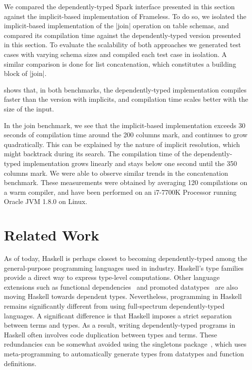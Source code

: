 We compared the dependently-typed Spark interface presented in this section against the implicit-based implementation of Frameless.
To do so, we isolated the implicit-based implementation of the |join| operation on table schemas, and compared its compilation time against the dependently-typed version presented in this section.
To evaluate the scalability of both approaches we generated test cases with varying schema sizes and compiled each test case in isolation.
A similar comparison is done for list concatenation, which constitutes a building block of |join|.

 shows that, in both benchmarks, the dependently-typed implementation compiles faster than the version with implicits, and compilation time scales better with the size of the input.

In the join benchmark, we see that the implicit-based implementation exceeds 30 seconds of compilation time around the 200 columns mark, and continues to grow quadratically.
This can be explained by the nature of implicit resolution, which might backtrack during its search.
The compilation time of the dependently-typed implementation grows linearly and stays below one second until the 350 columns mark.
We were able to observe similar trends in the concatenation benchmark.
These measurements were obtained by averaging 120 compilations on a warm compiler, and have been performed on an i7-7700K Processor running Oracle JVM 1.8.0 on Linux.

\section{Related Work}

As of today, Haskell is perhaps closest to becoming dependently-typed among the general-purpose programming languages used in industry.
Haskell's type families~\citep{kiselyov2010fun} provide a direct way to express type-level computations.
Other language extensions such as functional dependencies~\citep{jones2000type} and promoted datatypes~\citep{yorgey2012giving} are also moving Haskell towards dependent types.
Nevertheless, programming in Haskell remains significantly different from using full-spectrum dependently-typed languages.
A significant difference is that Haskell imposes a strict separation between terms and types.
As a result, writing dependently-typed programs in Haskell often involves code duplication between types and terms.
These redundancies can be somewhat avoided using the singletons package~\citep{eisenberg2012dependently}, which uses meta-programming to automatically generate types from datatypes and function definitions.

